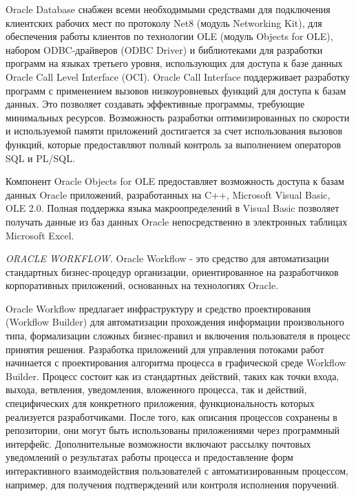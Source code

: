 Oracle Database снабжен всеми необходимыми средствами для подключения клиентских рабочих мест по протоколу Net8 (модуль Networking Kit), для обеспечения работы клиентов по технологии OLE (модуль Objects for OLE), набором ODBC-драйверов (ODBC Driver) и библиотеками для разработки программ на языках третьего уровня, использующих для доступа к базе данных Oracle Call Level Interface (OCI). Oracle Call Interface поддерживает разработку программ с применением вызовов низкоуровневых функций для доступа к базам данных. Это позволяет создавать эффективные программы, требующие минимальных ресурсов. Возможность разработки оптимизированных по скорости и используемой памяти приложений достигается за счет использования вызовов функций, которые предоставляют полный контроль за выполнением операторов SQL и PL/SQL.

Компонент Oracle Objects for OLE предоставляет возможность доступа к базам данных Oracle приложений, разработанных на C++, Microsoft Visual Basic, OLE 2.0. Полная поддержка языка макроопределений в Visual Basic позволяет получать данные из баз данных Oracle непосредственно в электронных таблицах Microsoft Excel.

\textit{ORACLE WORKFLOW.}
Oracle Workflow - это средство для автоматизации стандартных бизнес-процедур организации, ориентированное на разработчиков корпоративных приложений, основанных на технологиях Oracle.

Oracle Workflow предлагает инфраструктуру и средство проектирования (Workflow Builder) для автоматизации прохождения информации произвольного типа, формализации сложных бизнес-правил и включения пользователя в процесс принятия решения. Разработка приложений для управления потоками работ начинается с проектирования алгоритма процесса в графической среде Workflow Builder. Процесс состоит как из стандартных действий, таких как точки входа, выхода, ветвления, уведомления, вложенного процесса, так и действий, специфических для конкретного приложения, функциональность которых реализуется разработчиками. После того, как описания процессов сохранены в репозитории, они могут быть использованы приложениями через программный интерфейс. Дополнительные возможности включают рассылку почтовых уведомлений о результатах работы процесса и предоставление форм интерактивного взаимодействия пользователей с автоматизированным процессом, например, для получения подтверждений или контроля исполнения поручений.

